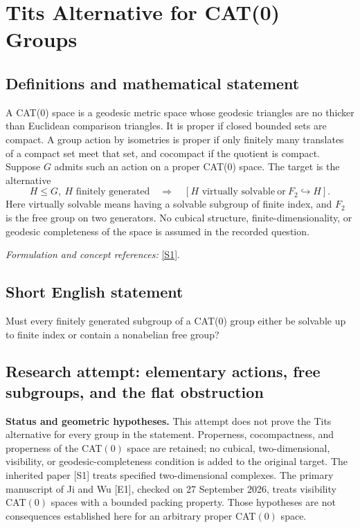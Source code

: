 \documentclass[11pt]{article}
\begin{document}
\section*{\texorpdfstring{Tits Alternative for CAT(0) Groups}{Tits Alternative for CAT(0) Groups}}\label{313}
\subsection{Definitions and mathematical statement}
A CAT(0) space is a geodesic metric space whose geodesic triangles are no thicker than Euclidean comparison triangles. It is proper if closed bounded sets are compact. A group action by isometries is proper if only finitely many translates of a compact set meet that set, and cocompact if the quotient is compact. Suppose $G$ admits such an action on a proper CAT(0) space. The target is the alternative
\[
 H\le G,\ H\text{ finitely generated}
 \quad\Longrightarrow\quad
 [H\text{ virtually solvable}\ \text{or}\ F_2\hookrightarrow H].
\]
Here virtually solvable means having a solvable subgroup of finite index, and $F_2$ is the free group on two generators. No cubical structure, finite-dimensionality, or geodesic completeness of the space is assumed in the recorded question.
\par\smallskip\textit{Formulation and concept references:} \href{https://www.cambridge.org/core/journals/forum-of-mathematics-pi/article/tits-alternative-for-2dimensional-mathrm-cat0-complexes/E1B5B96E5D4324F2F3707B4A05B2D86C}{[S1]}.

\subsection{Short English statement}
Must every finitely generated subgroup of a CAT(0) group either be solvable up to finite index or contain a nonabelian free group?
\subsection{Research attempt: elementary actions, free subgroups, and the flat obstruction}
\textbf{Status and geometric hypotheses.} This attempt does not prove the Tits alternative for every group in the statement. Properness, cocompactness, and properness of the CAT$(0)$ space are retained; no cubical, two-dimensional, visibility, or geodesic-completeness condition is added to the original target. The inherited paper [S1] treats specified two-dimensional complexes. The primary manuscript of Ji and Wu [E1], checked on 27 September 2026, treats visibility CAT$(0)$ spaces with a bounded packing property. Those hypotheses are not consequences established here for an arbitrary proper CAT$(0)$ space.
\end{document}
